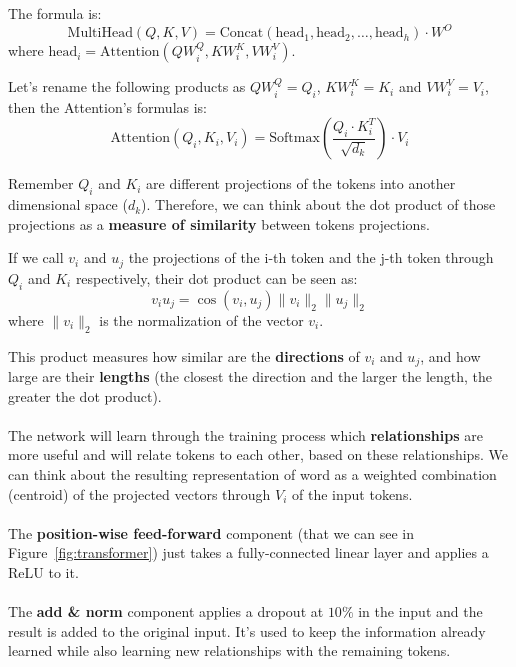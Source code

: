 \documentclass[oneside]{academica}
\begin{document}
The formula is:
\begin{equation*}
  \text{MultiHead}(Q,K,V) = \text{Concat}(\text{head}_1, \text{head}_2, \ldots, \text{head}_h) \cdot W^O
\end{equation*}
where $\text{head}_i = \text{Attention}(QW_i^Q, KW_i^K, VW_i^V)$.

\newpage

Let's rename the following products as $QW_i^Q = Q_i$, $KW_i^K = K_i$ and $VW_i^V = V_i$, then the Attention's formulas is:
\begin{equation*}
  \text{Attention}(Q_i, K_i, V_i) = \text{Softmax} \left( \frac{Q_i \cdot K_i^T}{\sqrt{d_k}} \right) \cdot V_i
\end{equation*}

Remember $Q_i$ and $K_i$ are different projections of the tokens into another dimensional space ($d_k$).
Therefore, we can think about the dot product of those projections as a \textbf{measure of similarity} between tokens projections.

If we call $v_i$ and $u_j$ the projections of the i-th token and the j-th token through $Q_i$ and $K_i$ respectively, their dot product can be seen as:
\begin{equation*}
  v_i u_j = \cos \left( v_i, u_j \right) \lVert v_i \rVert_2 \lVert u_j \rVert_2
\end{equation*}
where $\lVert v_i \rVert_2$ is the normalization of the vector $v_i$.

This product measures how similar are the \textbf{directions} of $v_i$ and $u_j$, and how large are their \textbf{lengths} (the closest the direction and the larger the length, the greater the dot product).
\\\\
The network will learn through the training process which \textbf{relationships} are more useful and will relate tokens to each other, based on these relationships.
We can think about the resulting representation of word as a weighted combination (centroid) of the projected vectors through $V_i$ of the input tokens.
\\\\
The \textbf{position-wise feed-forward} component (that we can see in Figure~\ref{fig:transformer}) just takes a fully-connected linear layer and applies a ReLU to it.
\\\\
The \textbf{add \& norm} component applies a dropout at $10 \%$ in the input and the result is added to the original input.
It's used to keep the information already learned while also learning new relationships with the remaining tokens.
\end{document}
